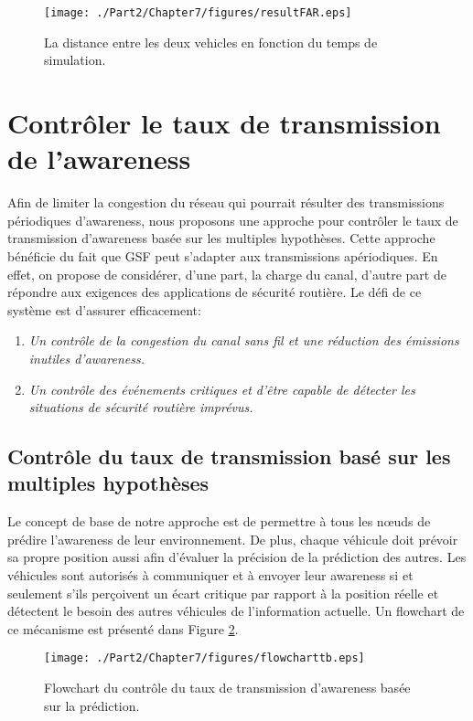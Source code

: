 \begin{figure}[!h]
\centering
\texttt{[image: ./Part2/Chapter7/figures/resultFAR.eps]}
\caption{La distance entre les deux vehicles en fonction du temps de simulation.}
\label{targetresult}
\end{figure}

\section{Contrôler le taux de transmission de l'awareness\label{cont3}}

Afin de limiter la congestion du réseau qui pourrait résulter des transmissions périodiques d'awareness, nous proposons une approche pour contrôler le taux de transmission d'awareness basée sur les multiples hypothèses. Cette approche bénéficie du fait que GSF peut s'adapter aux transmissions apériodiques.
En effet, on propose de considérer, d'une part, la charge du canal, d'autre part de répondre aux exigences des applications de sécurité routière. Le défi de ce système est d'assurer efficacement:
\begin{enumerate}
\item{\em Un contrôle de la congestion du canal sans fil et une réduction des émissions inutiles d'awareness.}
\item{\em Un contrôle des événements critiques et d'être capable de détecter les situations de sécurité routière imprévus.}
\end{enumerate}

\subsection{Contrôle du taux de transmission basé sur les multiples hypothèses}

Le concept de base de notre approche est de permettre à tous les nœuds de prédire l'awareness de leur environnement. De plus, chaque véhicule doit prévoir sa propre position aussi afin d'évaluer la précision de la prédiction des autres. Les véhicules sont autorisés à communiquer et à envoyer leur awareness si et seulement s'ils perçoivent un écart critique par rapport à la position réelle et détectent le besoin des autres véhicules de l'information actuelle. Un flowchart de ce mécanisme est présenté dans Figure \ref{flowchartTB}.

\begin{figure}[!h]
\centering
\texttt{[image: ./Part2/Chapter7/figures/flowcharttb.eps]}
\caption{Flowchart du contrôle du taux de transmission d'awareness basée sur la prédiction.}
\label{flowchartTB}
\end{figure}

